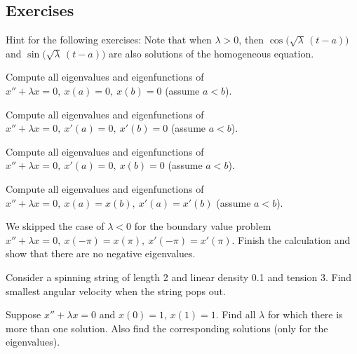 \subsection{Exercises}

Hint for the following exercises:  Note that
when $\lambda > 0$, then
$\cos \bigl( \sqrt{\lambda}\, (t - a) \bigr)$
and $\sin  \bigl( \sqrt{\lambda}\, (t - a) \bigr)$
are also solutions of the homogeneous
equation.

\begin{exercise}
Compute all
eigenvalues and eigenfunctions of
$x'' + \lambda x = 0, ~ x(a) = 0, ~ x(b) = 0$ (assume $a < b$).
\end{exercise}

\begin{exercise}
Compute all
eigenvalues and eigenfunctions of
$x'' + \lambda x = 0, ~ x'(a) = 0, ~ x'(b) = 0$ (assume $a < b$).
\end{exercise}

\begin{exercise}
Compute all
eigenvalues and eigenfunctions of
$x'' + \lambda x = 0, ~ x'(a) = 0, ~ x(b) = 0$ (assume $a < b$).
\end{exercise}

\begin{exercise}
Compute all 
eigenvalues and eigenfunctions of
$x'' + \lambda x = 0, ~ x(a) = x(b), ~ x'(a) = x'(b)$ (assume $a < b$).
\end{exercise}

\begin{exercise}
We skipped the case of $\lambda < 0$ for
the boundary value problem
$x'' + \lambda x = 0, ~ x(-\pi) = x(\pi), ~ x'(-\pi) = x'(\pi)$.
Finish the calculation and show that there are no negative eigenvalues.
\end{exercise}

\setcounter{exercise}{100}

\begin{exercise}
Consider a spinning string of length 2 and linear density 0.1 and tension 3.
Find smallest angular velocity when the string pops out.
\end{exercise}

\begin{exercise}
Suppose $x'' + \lambda x = 0$ and $x(0)=1$, $x(1) = 1$.
Find all $\lambda$ for which there is more
than one solution.  Also find the corresponding solutions (only for the
eigenvalues).
\end{exercise}

